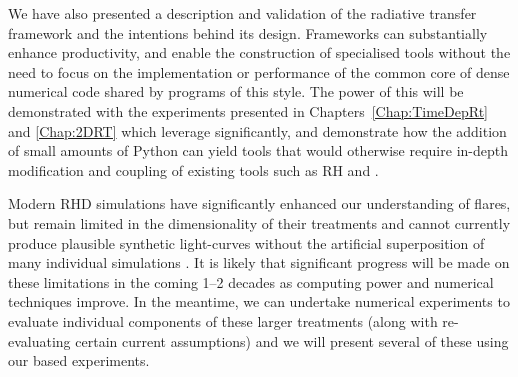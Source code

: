 We have also presented a description and validation of the \Lw{} radiative transfer framework and the intentions behind its design.
Frameworks can substantially enhance productivity, and enable the construction of specialised tools without the need to focus on the implementation or performance of the common core of dense numerical code shared by programs of this style.
The power of this will be demonstrated with the experiments presented in Chapters~\ref{Chap:TimeDepRt} and \ref{Chap:2DRT} which leverage \Lw{} significantly, and demonstrate how the addition of small amounts of Python can yield tools that would otherwise require in-depth modification and coupling of existing tools such as RH and \Radyn{}.

Modern RHD simulations have significantly enhanced our understanding of flares, but remain limited in the dimensionality of their treatments and cannot currently produce plausible synthetic light-curves without the artificial superposition of many individual simulations \citep[e.g.][]{Kerr2020}.
It is likely that significant progress will be made on these limitations in the coming 1--2 decades as computing power and numerical techniques improve.
In the meantime, we can undertake numerical experiments to evaluate individual components of these larger treatments (along with re-evaluating certain current assumptions) and we will present several of these using our \Lw{} based experiments.